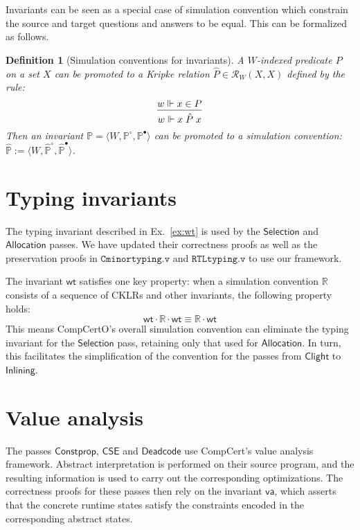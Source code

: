 \documentclass[draft,11pt]{report}
\newtheorem{definition}{Definition}
\newcommand{\kw}[1]{\ensuremath{ \mathsf{#1} }}
\newcommand{\que}{\circ}         %
\newcommand{\ans}{\bullet}       %
\begin{document}
Invariants can be seen as a special case of simulation convention
which constrain the source and target questions and answers
to be equal.
This can be formalized as follows.

\begin{definition}[Simulation conventions for invariants]
A $W$-indexed predicate $P$ on a set $X$
can be promoted to a Kripke relation
$\hat{P} \in \mathcal{R}_W(X, X)$
defined by the rule:
\[
  \begin{prooftree}
    \hypo{w \Vdash x \in P}
    \infer1{w \Vdash x \mathrel{\hat{P}} x}
  \end{prooftree}
\]
Then an invariant
$\mathbb{P} = \langle W, \mathbb{P}^\que, \mathbb{P}^\ans \rangle$
can be promoted to a simulation convention:
$\hat{\mathbb{P}} :=
 \langle W, \hat{\mathbb{P}}^\que, \hat{\mathbb{P}}^\ans \rangle$.
\end{definition}


\section{Typing invariants} \label{sec:wt} %

The typing invariant described in Ex.~\ref{ex:wt}
is used by the $\kw{Selection}$ and $\kw{Allocation}$ passes.
We have updated their correctness proofs
as well as the preservation proofs in
$\texttt{Cminortyping.v}$ and $\texttt{RTLtyping.v}$
to use our framework.

The invariant $\kw{wt}$ satisfies one key property:
when a simulation convention $\mathbb{R}$
consists of a sequence of CKLRs and other invariants,
the following property holds:
\[
  \kw{wt} \cdot \mathbb{R} \cdot \kw{wt} \equiv
  \mathbb{R} \cdot \kw{wt}
\]
This means CompCertO's overall simulation convention
can eliminate the typing invariant for the $\kw{Selection}$ pass,
retaining only that used for $\kw{Allocation}$.
In turn, this facilitates the simplification of the convention for
the passes from \kw{Clight} to \kw{Inlining}.


\section{Value analysis} \label{sec:va} %

The passes
$\kw{Constprop}$, $\kw{CSE}$ and $\kw{Deadcode}$
use CompCert's value analysis framework.
Abstract interpretation is performed %
on their source program,
and the resulting information is used to carry out
the corresponding optimizations.
The correctness proofs for these passes then rely
on the invariant $\kw{va}$,
which asserts that the concrete runtime states
satisfy the constraints encoded in the corresponding
abstract states.
\end{document}
